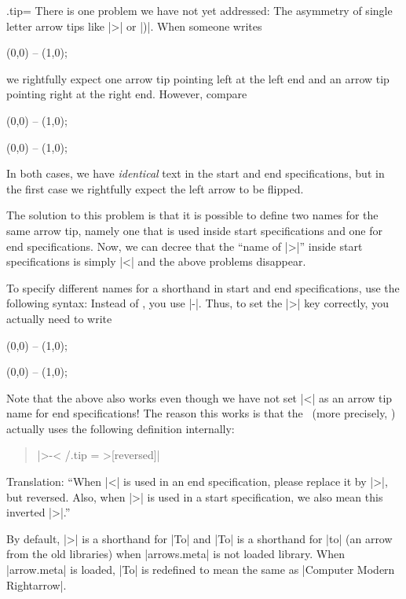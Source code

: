 \begin{handler}{{.tip}{=}}
    There is one problem we have not yet addressed: The asymmetry of single
    letter arrow tips like |>| or |)|. When someone writes
\begin{codeexample}[]
\tikz \draw [<->] (0,0) -- (1,0);
\end{codeexample}
    we rightfully expect one arrow tip pointing left at the left end and an
    arrow tip pointing right at the right end. However, compare
\begin{codeexample}[]
\tikz \draw [>->] (0,0) -- (1,0);
\end{codeexample}
\begin{codeexample}[]
\tikz {} (0,0) -- (1,0);
\end{codeexample}
    In both cases, we have \emph{identical} text in the start and end
    specifications, but in the first case we rightfully expect the left arrow
    to be flipped.

    The solution to this problem is that it is possible to define two names for
    the same arrow tip, namely one that is used inside start specifications and
    one for end specifications. Now, we can decree that the ``name of |>|''
    inside start specifications is simply |<| and the above problems disappear.

    To specify different names for a shorthand in start and end specifications,
    use the following syntax: Instead of , you use |-|. Thus, to set the
    |>| key correctly, you actually need to write
\begin{codeexample}[]
\tikz [<-> /.tip = Stealth] \draw [<->>] (0,0) -- (1,0);
\end{codeexample}
\begin{codeexample}[]
\tikz [<-> /.tip = Latex] \draw [>-<] (0,0) -- (1,0);
\end{codeexample}

    Note that the above also works even though we have not set |<| as an arrow
    tip name for end specifications! The reason this works is that the
    \tikzname\ (more precisely, \pgfname) actually uses the following
    definition internally:
    \begin{quote}
        |>-< /.tip = >[reversed]|
    \end{quote}
    Translation: ``When |<| is used in an end specification, please replace it
    by |>|, but reversed. Also, when |>| is used in a start specification, we
    also mean this inverted |>|.''

    By default, |>| is a shorthand for |To| and |To| is a shorthand for |to|
    (an arrow from the old libraries) when |arrows.meta| is not loaded library.
    When |arrow.meta| is loaded, |To| is redefined to mean the same as
    |Computer Modern Rightarrow|.
\end{handler}

